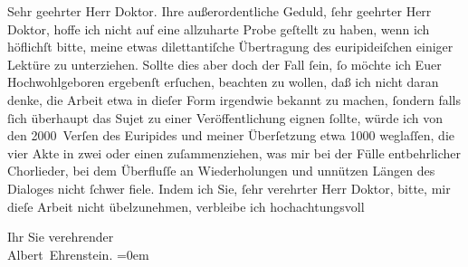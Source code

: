 \pstart{}Sehr geehrter Herr Doktor.\pend\vspace{0.5em}
\pstart
           Ihre außerordentliche Geduld,{ }ſehr geehrter Herr Doktor, hoffe ich nicht auf eine
               allzuharte Probe geſtellt zu haben, wenn ich höflichſt bitte, meine etwas
               dilettantiſche Übertragung des euripideiſchen\label{K_L01640-1v}\label{K_L01640-1} einiger Lektüre zu
               unterziehen. Sollte dies aber doch der Fall{ }ſein,{ }ſo möchte ich Euer Hochwohlgeboren
               ergebenſt erſuchen, beachten zu wollen, daß ich nicht daran denke, die Arbeit etwa in
               dieſer Form {\pb}irgendwie bekannt zu machen,{ }ſondern falls{ }ſich überhaupt das Sujet zu einer Veröffentlichung eignen{ }ſollte, würde
               ich von den 2000 Verſen des Euripides und
               meiner Überſetzung etwa 1000 weglaſſen, die vier Akte in zwei oder einen
               zuſammenziehen, was mir bei der Fülle entbehrlicher Chorlieder, bei dem Überfluſſe an
               Wiederholungen und unnützen Längen des Dialoges nicht{ }ſchwer fiele. Indem ich Sie,{ }ſehr verehrter Herr Doktor, bitte, mir dieſe Arbeit nicht übelzunehmen, verbleibe ich
               hochachtungsvoll\pend
           
\pstart
           Ihr Sie verehrender{\\[\baselineskip]}\spacefill\mbox{Albert Ehrenstein.}\pend
           \leftskip=0em{}\endnumbering{}  \newcommand{\dateiname}{L01640}\newcommand{\titel}{Albert Ehrenstein an Arthur Schnitzler, 30. 11. 1906}\newcommand{\editorInnen}{Martin Anton Müller und Gerd-Hermann Susen}

